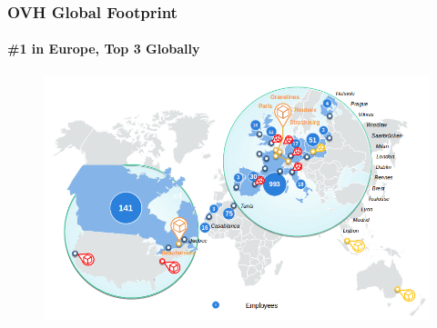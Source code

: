 \documentclass{beamer}
\begin{document}
	\begin{frame}
	\frametitle{OVH Global Footprint}
	\framesubtitle{\#1 in Europe, Top 3 Globally}
	        \begin{figure}[h]
                \centering
                \includegraphics[width=.8\textwidth]{./images/OVH-global_presence}
        	\end{figure}
	\end{frame}
\end{document}
